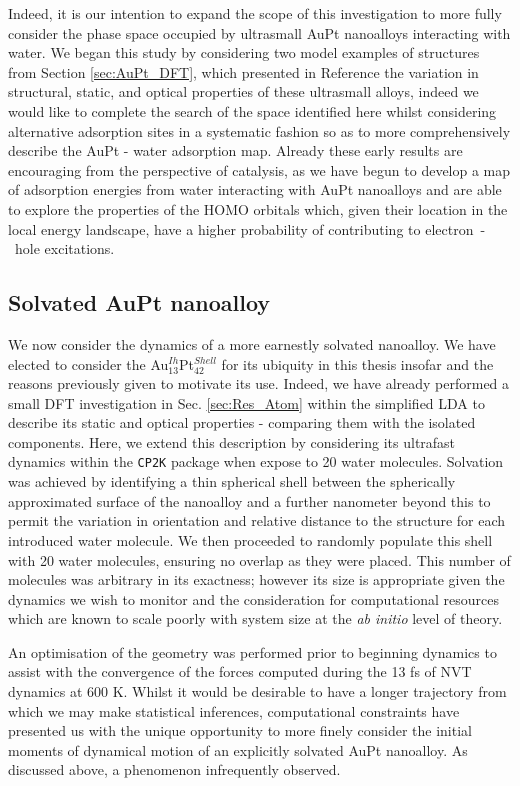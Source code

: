Indeed, it is our intention to expand the scope of this investigation to more fully consider the phase space occupied by ultrasmall AuPt nanoalloys interacting with water. We began this study by considering two model examples of structures from Section \ref{sec:AuPt_DFT}, which presented in Reference \cite{JonesAuPt} the variation in structural, static, and optical properties of these ultrasmall alloys, indeed we would like to complete the search of the space identified here whilst considering alternative adsorption sites in a systematic fashion so as to more comprehensively describe the AuPt - water adsorption map. Already these early results are encouraging from the perspective of catalysis, as we have begun to develop a map of adsorption energies from water interacting with AuPt nanoalloys and are able to explore the properties of the HOMO orbitals which, given their location in the local energy landscape, have a higher probability of contributing to electron~-~hole excitations.

\subsection{Solvated AuPt nanoalloy}

We now consider the dynamics of a more earnestly solvated nanoalloy. We have elected to consider the Au$_{13}^{Ih}$Pt$_{42}^{Shell}$ for its ubiquity in this thesis insofar and the reasons previously given to motivate its use. Indeed, we have already performed a small DFT investigation in Sec. \ref{sec:Res_Atom} within the simplified LDA to describe its static and optical properties - comparing them with the isolated components. Here, we extend this description by considering its ultrafast dynamics within the \texttt{CP2K} package when expose to 20 water molecules. Solvation was achieved by identifying a thin spherical shell between the spherically approximated surface of the nanoalloy and a further nanometer beyond this to permit the variation in orientation and relative distance to the structure for each introduced water molecule. We then proceeded to randomly populate this shell with 20 water molecules, ensuring no overlap as they were placed. This number of molecules was arbitrary in its exactness; however its size is appropriate given the dynamics we wish to monitor and the consideration for computational resources which are known to scale poorly with system size at the \textit{ab initio} level of theory.

An optimisation of the geometry was performed prior to beginning dynamics to assist with the convergence of the forces computed during the 13 fs of NVT dynamics at 600 K. Whilst it would be desirable to have a longer trajectory from which we may make statistical inferences, computational constraints have presented us with the unique opportunity to more finely consider the initial moments of dynamical motion of an explicitly solvated AuPt nanoalloy. As discussed above, a phenomenon infrequently observed.

